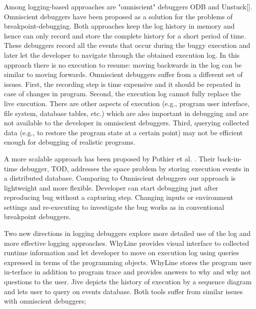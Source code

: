 \documentclass[preprint]{sigplanconf}
\begin{document}
Among logging-based approaches are "omniscient" debuggers
ODB\cite{Lewis} and Unstuck[]. Omniscient debuggers have been proposed
as a solution for the problems of breakpoint-debugging. Both
approaches keep the log history in memory and hence can only record
and store the complete history for a short period of time. These
debuggers record all the events that occur during the buggy execution
and later let the developer to navigate through the obtained execution
log. In this approach there is no execution to resume: moving
backwards in the log can be similar to moving forwards. Omniscient
debuggers suffer from a different set of issues. First, the recording
step is time expensive and it should be repeated in case of changes in
program. Second, the execution log cannot fully replace the live
execution. There are other aspects of execution (e.g., program user
interface, file system, database tables, etc.) which are also
important in debugging and are not available to the developer in
omniscient debuggers. Third, querying collected data (e.g., to restore
the program state at a certain point) may not be efficient enough for
debugging of realistic programs.

A more scalable approach has been proposed by Pothier et
al. \cite{Pothier}. Their back-in-time debugger, TOD, addresses the
space problem by storing execution events in a distributed
database. Comparing to Omniscient debuggers our approach is
lightweight and more flexible. Developer can start debugging just
after reproducing bug without a capturing step.  Changing inputs or
environment settings and re-executing to investigate the bug works as
in conventional breakpoint debuggers.

Two new directions in logging debuggers explore more detailed use of
the log and more effective logging approaches. WhyLine\cite{Ko}
provides visual interface to collected runtime information and let
developer to move on execution log using queries expressed in terms of
the programming objects. WhyLine stores the program user in-terface in
addition to program trace and provides answers to why and why not
questions to the user. Jive\cite{Czyz} depicts the history of
execution by a sequence diagram and lets user to query on events
database. Both tools suffer from similar issues with omniscient
debuggers;
\end{document}

